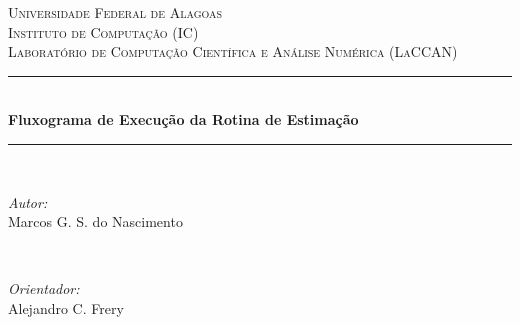 \documentclass[11pt]{article}
\begin{document}
\begin{titlepage}

\newcommand{\HRule}{\rule{\linewidth}{0.5mm}} %

\center %
 

\textsc{\LARGE Universidade Federal de Alagoas}\\[1.5cm] %
\textsc{\Large Instituto de Computação (IC)}\\[0.5cm] %
\textsc{\large Laboratório de Computação Científica e Análise Numérica (LaCCAN)}\\[3.5cm] %


\HRule \\[0.4cm]
{ \LARGE \bfseries Fluxograma de Execução da Rotina de Estimação}\\[0.4cm] 
\HRule \\[2.5cm]
 

\begin{minipage}{0.4\textwidth}
\begin{flushleft} \large
\emph{Autor:}\\
Marcos G. S. do Nascimento %
\end{flushleft}
\end{minipage}
~
\begin{minipage}{0.4\textwidth}
\begin{flushright} \large
\emph{Orientador:} \\
Alejandro C. Frery  %
\end{flushright}
\end{minipage}\\[8cm]



\end{titlepage}
\end{document}
